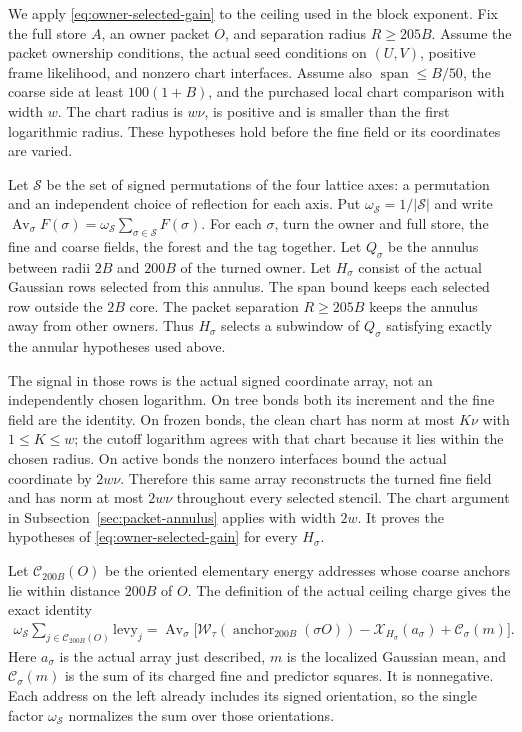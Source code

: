 We apply \eqref{eq:owner-selected-gain} to the ceiling used in
the block exponent. Fix the full store $A$, an owner packet
$O$, and separation radius $R\ge205B$. Assume the packet
ownership conditions, the actual seed conditions on $(U,V)$,
positive frame likelihood, and nonzero chart interfaces. Assume also
$\operatorname{span}\le B/50$, the coarse side at least
$100(1+B)$, and the purchased local chart comparison with
width $w$. The chart radius is $w\nu$, is positive and is
smaller than the first logarithmic radius. These hypotheses
hold before the fine field or its coordinates are varied.

Let $\mathcal S$ be the set of signed permutations of the four lattice
axes: a permutation and an independent choice of reflection for each
axis. Put $\omega_{\mathcal S}=1/|\mathcal S|$ and write
$\operatorname{Av}_{\sigma}F(\sigma)=\omega_{\mathcal S}
\sum_{\sigma\in\mathcal S}F(\sigma)$. For each $\sigma$, turn the owner and
full store, the fine and coarse fields, the forest and the tag together.
Let $Q_\sigma$ be the annulus between radii $2B$ and $200B$
of the turned owner. Let $H_\sigma$ consist of the actual
Gaussian rows selected from this annulus. The span bound keeps
each selected row outside the $2B$ core. The packet separation
$R\ge205B$ keeps the annulus away from other owners. Thus
$H_\sigma$ selects a subwindow of $Q_\sigma$ satisfying
exactly the annular hypotheses used above.

The signal in those rows is the actual signed coordinate array,
not an independently chosen logarithm. On tree bonds both its
increment and the fine field are the identity. On frozen bonds,
the clean chart has norm at most $K\nu$ with $1\le K\le w$;
the cutoff logarithm agrees with that chart because it lies
within the chosen radius. On active bonds the nonzero interfaces
bound the actual coordinate by $2w\nu$. Therefore this same
array reconstructs the turned fine field and has norm at most
$2w\nu$ throughout every selected stencil. The chart argument
in Subsection~\ref{sec:packet-annulus} applies with width $2w$.
It proves the hypotheses of \eqref{eq:owner-selected-gain}
for every $H_\sigma$.

Let $\mathcal C_{200B}(O)$ be the oriented elementary energy
addresses whose coarse anchors lie within distance $200B$ of
$O$. The definition of the actual ceiling charge gives the exact
identity
\begin{equation}\label{eq:owner-ceiling-identity}
\begin{split}
 \omega_{\mathcal S}\sum_{j\in\mathcal C_{200B}(O)}
             \mathrm{levy}_j
 =\operatorname{Av}_{\sigma}\bigl[
       \mathcal W_\tau(\operatorname{anchor}_{200B}(\sigma O))
       -\mathcal X_{H_\sigma}(a_\sigma)
       +\mathcal C_\sigma(m)\bigr].
\end{split}
\end{equation}
Here $a_\sigma$ is the actual array just described, $m$ is
the localized Gaussian mean, and $\mathcal C_\sigma(m)$
is the sum of its charged fine and predictor squares. It is
nonnegative. Each address on the left already includes its signed orientation, so
the single factor $\omega_{\mathcal S}$ normalizes the sum over those
orientations.

